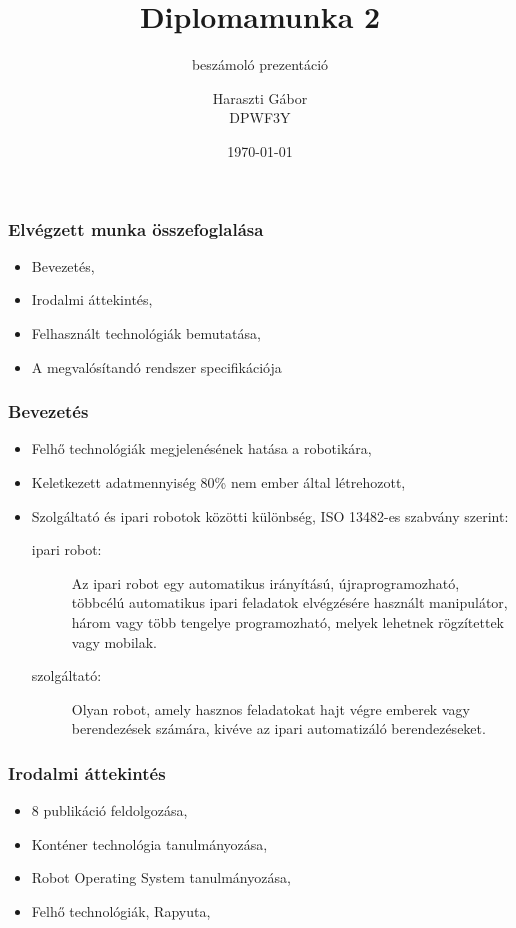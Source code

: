 \documentclass{beamer}
\author{Haraszti Gábor \\DPWF3Y}
\title{Diplomamunka 2}
\subtitle{beszámoló prezentáció}
\date{\today}
\begin{document}
 

\begin{frame} 
\titlepage
\end{frame}

\begin{frame} 
\frametitle{Elvégzett munka összefoglalása}
\begin{itemize}
\item Bevezetés,
\item Irodalmi áttekintés,
\item Felhasznált technológiák bemutatása,
\item A megvalósítandó rendszer specifikációja
\end{itemize}
\end{frame}

\begin{frame} 
\frametitle{Bevezetés}
\begin{itemize}
	\item Felhő technológiák megjelenésének hatása a robotikára,
	\item Keletkezett adatmennyiség 80\% nem ember által létrehozott,
	\item Szolgáltató és ipari robotok közötti különbség, ISO
	13482-es szabvány szerint:
	\begin{description}
	\item[ipari robot:] Az ipari robot egy automatikus irányítású, újraprogramozható, többcélú automatikus ipari feladatok elvégzésére használt manipulátor, három vagy több tengelye programozható, melyek lehetnek rögzítettek vagy mobilak.
	\item[szolgáltató:] Olyan robot, amely hasznos feladatokat hajt végre emberek vagy berendezések számára, kivéve az ipari automatizáló berendezéseket.
	\end{description}
\end{itemize}
\end{frame}

\begin{frame} 
\frametitle{Irodalmi áttekintés}
\begin{itemize}
	\item 8 publikáció feldolgozása,
	\item Konténer technológia tanulmányozása,
	\item Robot Operating System tanulmányozása,
	\item Felhő technológiák, Rapyuta,
\end{itemize}
\end{frame}
\end{document}
